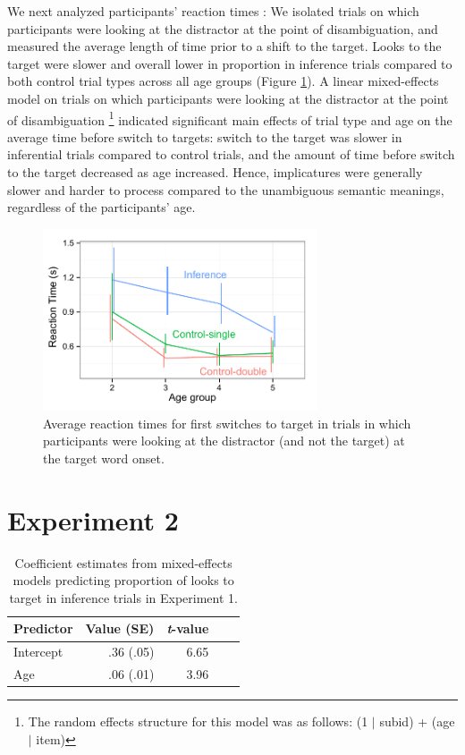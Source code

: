 \documentclass[10pt,letterpaper]{article}
\begin{document}
We next analyzed participants' reaction times \cite{fernald2008looking}: We isolated trials on which participants were looking at the distractor at the point of disambiguation, and measured the average length of time prior to a shift to the target. Looks to the target were slower and overall lower in proportion in inference trials compared to both control trial types across all age groups (Figure \ref{fig:rt}). A linear mixed-effects model on trials on which participants were looking at the distractor at the point of disambiguation \footnote{The random effects structure for this model was as follows: (1 $|$ subid) + (age $|$ item)} indicated significant main effects of trial type and age on the average time before switch to targets: switch to the target was slower in inferential trials compared to control trials, and the amount of time before switch to the target decreased as age increased. Hence, implicatures were generally slower and harder to process compared to the unambiguous semantic meanings, regardless of the participants' age. 

\begin{figure}
\begin{centering} 
\includegraphics[width=3.2in]{figures/expt1-rt.pdf}
\caption{\label{fig:rt} Average reaction times for first switches to target in trials in which participants were looking at the distractor (and not the target) at the target word onset.}
\end{centering} 
\end{figure}

\section{Experiment 2}

\begin{table}[b!]
\caption{\label{tab:lmer2}  Coefficient estimates from mixed-effects models predicting proportion of looks to target in inference trials in Experiment 1.} 
\begin{center} 
\begin{tabular}{l r r r l} 
\hline
Predictor  &  Value (SE) & \emph{t}-value\\
\hline
Intercept  & .36 (.05) & 6.65 \\
Age & .06 (.01) &  3.96 \\
\hline
\end{tabular} 
\end{center} 
\end{table}
\end{document}
